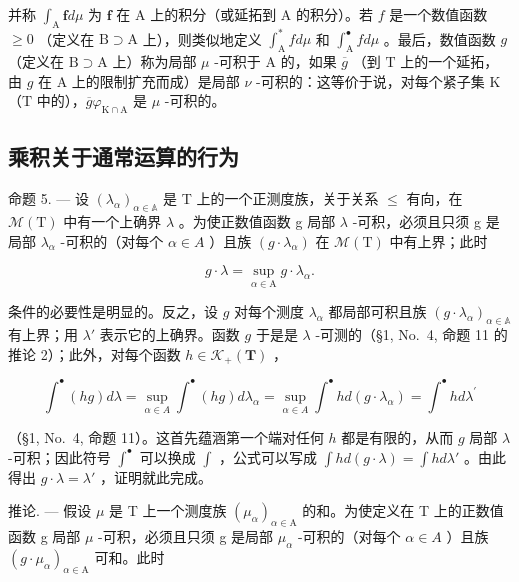 并称 \(\int_{\mathrm{A}} \mathbf{f} d\mu\) 为 \(\mathbf{f}\) 在 \(\mathrm{A}\) 上的积分（或延拓到 \(\mathrm{A}\) 的积分）。若 \(f\) 是一个数值函数 \(\geqslant 0\) （定义在 \(\mathrm{B} \supset \mathrm{A}\) 上），则类似地定义 \(\int_{\mathrm{A}}^{*} f d\mu\) 和 \(\int_{\mathrm{A}}^{\bullet} f d\mu\) 。最后，数值函数 \(g\) （定义在 \(\mathrm{B} \supset \mathrm{A}\) 上）称为局部 \(\mu\) -可积于 \(\mathrm{A}\) 的，如果 \(\overline{g}\) （到 \(\mathrm{T}\) 上的一个延拓，由 \(g\) 在 \(\mathrm{A}\) 上的限制扩充而成）是局部 \(\nu\) -可积的：这等价于说，对每个紧子集 \(\mathrm{K}\) （\(\mathrm{T}\) 中的），\(\overline{g}\varphi_{\mathrm{K} \cap \mathrm{A}}\) 是 \(\mu\) -可积的。

\subsection{乘积关于通常运算的行为}

命题 5. --- 设 \((\lambda_{\alpha})_{\alpha\in\mathbb{A}}\) 是 T 上的一个正测度族，关于关系 \(\leqslant\) 有向，在 \(\mathcal{M}(\mathrm{T})\) 中有一个上确界 \(\lambda\) 。为使正数值函数 g 局部 \(\lambda\) -可积，必须且只须 g 是局部 \(\lambda_{\alpha}\) -可积的（对每个 \(\alpha\in A\) ）且族 \((g\cdot\lambda_{\alpha})\) 在 \(\mathcal{M}(\mathrm{T})\) 中有上界；此时

\[
g \cdot \lambda = \sup _ {\alpha \in \mathrm{A}} g \cdot \lambda_ {\alpha}.
\]

条件的必要性是明显的。反之，设 \(g\) 对每个测度 \(\lambda_{\alpha}\) 都局部可积且族 \((g \cdot \lambda_{\alpha})_{\alpha \in \mathbb{A}}\) 有上界；用 \(\lambda'\) 表示它的上确界。函数 \(g\) 于是是 \(\lambda\) -可测的（§1, No.~4, 命题 11 的推论 2）；此外，对每个函数 \(h \in \mathcal{K}_{+}(\mathbf{T})\) ，

\[
\int^ {\bullet} (h g) d \lambda = \sup _ {\alpha \in A} \int^ {\bullet} (h g) d \lambda_ {\alpha} = \sup _ {\alpha \in A} \int^ {\bullet} h d (g \cdot \lambda_ {\alpha}) = \int^ {\bullet} h d \lambda^ {\prime}
\]

（§1, No.~4, 命题 11）。这首先蕴涵第一个端对任何 \(h\) 都是有限的，从而 \(g\) 局部 \(\lambda\) -可积；因此符号 \(\int^{\bullet}\) 可以换成 \(\int\) ，公式可以写成 \(\int h d(g \cdot \lambda) = \int h d\lambda'\) 。由此得出 \(g \cdot \lambda = \lambda'\) ，证明就此完成。

推论. --- 假设 \(\mu\) 是 T 上一个测度族 \((\mu_{\alpha})_{\alpha\in\mathrm{A}}\) 的和。为使定义在 T 上的正数值函数 g 局部 \(\mu\) -可积，必须且只须 g 是局部 \(\mu_{\alpha}\) -可积的（对每个 \(\alpha\in A\) ）且族 \((g\cdot\mu_{\alpha})_{\alpha\in\mathrm{A}}\) 可和。此时

